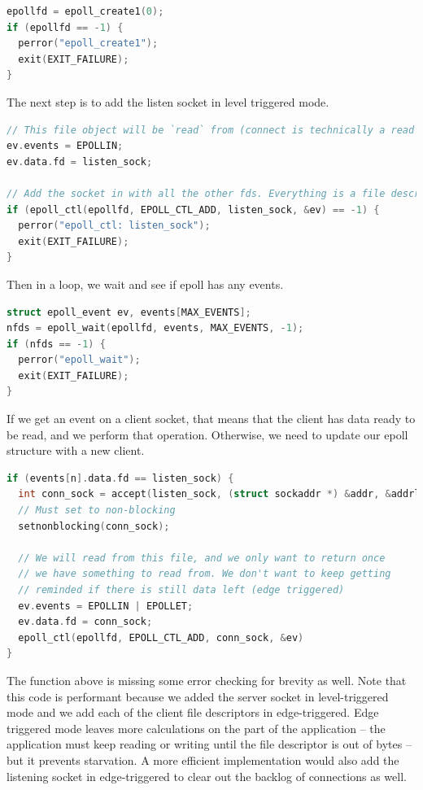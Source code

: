 \begin{lstlisting}[language=C]
epollfd = epoll_create1(0);
if (epollfd == -1) {
  perror("epoll_create1");
  exit(EXIT_FAILURE);
}
\end{lstlisting}

The next step is to add the listen socket in level triggered mode.
\begin{lstlisting}[language=C]
// This file object will be `read` from (connect is technically a read operation)
ev.events = EPOLLIN;
ev.data.fd = listen_sock;

// Add the socket in with all the other fds. Everything is a file descriptor
if (epoll_ctl(epollfd, EPOLL_CTL_ADD, listen_sock, &ev) == -1) {
  perror("epoll_ctl: listen_sock");
  exit(EXIT_FAILURE);
}
\end{lstlisting}

Then in a loop, we wait and see if epoll has any events.

\begin{lstlisting}[language=C]
struct epoll_event ev, events[MAX_EVENTS];
nfds = epoll_wait(epollfd, events, MAX_EVENTS, -1);
if (nfds == -1) {
  perror("epoll_wait");
  exit(EXIT_FAILURE);
}
\end{lstlisting}

If we get an event on a client socket, that means that the client has data ready to be read, and we perform that operation.
Otherwise, we need to update our epoll structure with a new client.

\begin{lstlisting}[language=C]
if (events[n].data.fd == listen_sock) {
  int conn_sock = accept(listen_sock, (struct sockaddr *) &addr, &addrlen);
  // Must set to non-blocking
  setnonblocking(conn_sock);

  // We will read from this file, and we only want to return once
  // we have something to read from. We don't want to keep getting
  // reminded if there is still data left (edge triggered)
  ev.events = EPOLLIN | EPOLLET;
  ev.data.fd = conn_sock;
  epoll_ctl(epollfd, EPOLL_CTL_ADD, conn_sock, &ev)
}
\end{lstlisting}

The function above is missing some error checking for brevity as well.
Note that this code is performant because we added the server socket in level-triggered mode and we add each of the client file descriptors in edge-triggered.
Edge triggered mode leaves more calculations on the part of the application -- the application must keep reading or writing until the file descriptor is out of bytes -- but it prevents starvation.
A more efficient implementation would also add the listening socket in edge-triggered to clear out the backlog of connections as well.

